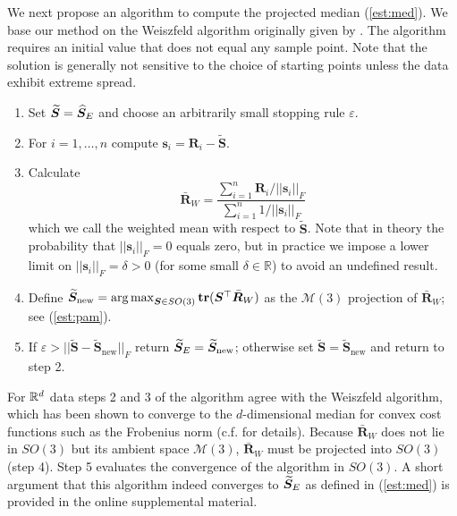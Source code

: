 We next propose an algorithm to compute the projected median (\ref{est:med}).  We base our method on the Weiszfeld algorithm originally given by \cite{weiszfeld37}.  The algorithm requires an initial value that does not equal any sample point.   Note that the solution is generally not sensitive to the choice of starting points unless the data exhibit extreme spread.
\begin{enumerate}
\item Set $\widetilde{\bm S}={\widehat{\bm S}_E}$ and choose an arbitrarily small stopping rule $\varepsilon$.
\item For $i=1,\ldots,n$ compute $\bm s_i=\bm R_i-\widetilde{\bm S}$.
\item Calculate
\[
\bar{\bm R}_W=\frac{\sum_{i=1}^n\bm R_i/||\bm s_i||_F}{\sum_{i=1}^n1/||\bm s_i||_F}
\]
which we call the weighted mean with respect to $\widetilde{\bm S}$. Note that in theory the probability that $||\bm s_i||_F = 0$ equals zero, but in practice we impose a lower limit on $||\bm s_i||_F = \delta > 0$ (for some small $\delta \in \mathbb R$) to avoid an undefined result.
\item Define $\widetilde{\bm S}_{\text{new}} = \operatorname*{arg\,max}_{\bm{S}\in
SO(3)}{\mathbf{tr}}(\bm{S}^{\top}\bar{\bm{R}}_W)$ as the $\mathcal{M}(3)$ projection of $\bar{\bm R}_W$; see (\ref{est:pam}).
\item If $\varepsilon>||\widetilde{\bm S}-\widetilde{\bm S}_{\text{new}}||_F$ return ${\widetilde{\bm S}_E}=\widetilde{\bm S}_{\text{new}}$; otherwise set $\widetilde{\bm S}=\widetilde{\bm S}_{\text{new}}$ and return to step 2.
\end{enumerate}
For ${\mathbb{R}}^d$ data steps 2 and 3 of the algorithm agree with the Weiszfeld algorithm, which has been shown to converge to the $d$-dimensional median for convex cost functions such as the Frobenius norm (c.f. \cite{weiszfeld37} for details).  Because $\bar{\bm R}_W$ does not lie in  $SO(3)$ but its ambient space $\mathcal{M}(3)$, $\bar{\bm R}_W$ must be projected into $SO(3)$ (step 4).  Step 5 evaluates the convergence of the algorithm in $SO(3)$.  A short argument that this algorithm indeed converges to ${\widetilde{\bm S}_E}$ as defined in (\ref{est:med}) is provided in the online supplemental material.

